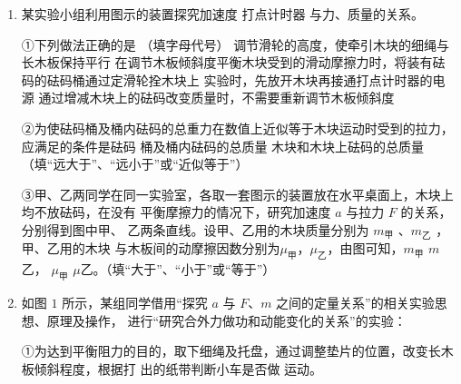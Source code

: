 \begin{enumerate}
\renewcommand{\labelenumi}{\arabic{enumi}.}
\item
{}
某实验小组利用图示的装置探究加速度
打点计时器
与力、质量的关系。
\begin{figure}[h!]
\centering

\end{figure}



①下列做法正确的是  （填字母代号）
\fourchoices
{调节滑轮的高度，使牵引木块的细绳与长木板保持平行}
{在调节木板倾斜度平衡木块受到的滑动摩擦力时，将装有砝码的砝码桶通过定滑轮拴木块上}
{实验时，先放开木块再接通打点计时器的电源}
{通过增减木块上的砝码改变质量时，不需要重新调节木板倾斜度}

②为使砝码桶及桶内砝码的总重力在数值上近似等于木块运动时受到的拉力，应满足的条件是砝码
桶及桶内砝码的总质量
木块和木块上砝码的总质量（填“远大于”、“远小于”或“近似等于”）


③甲、乙两同学在同一实验室，各取一套图示的装置放在水平桌面上，木块上均不放砝码，在没有
平衡摩擦力的情况下，研究加速度 $ a $ 与拉力 $ F $ 的关系，分别得到图中甲、
乙两条直线。设甲、乙用的木块质量分别为 $ m_{ \text{甲} } $ 、$ m_{ \text{乙} } $ ，甲、乙用的木块
与木板间的动摩擦因数分别为$ \mu_{ \text{甲} } $，$ \mu_{ \text{乙} } $，由图可知，$ m_{ \text{甲} } $ 
$ m $ 乙，
$ \mu_{ \text{甲} } $
$ \mu $乙。（填“大于”、“小于”或“等于”）
\begin{figure}[h!]
\centering

\end{figure}



\newpage
\item 
{}
如图 $ 1 $ 所示，某组同学借用“探究 $ a $ 与 $ F $、$ m $ 之间的定量关系”的相关实验思想、原理及操作，
进行“研究合外力做功和动能变化的关系”的实验：
\begin{figure}[h!]
\centering

\end{figure}




①为达到平衡阻力的目的，取下细绳及托盘，通过调整垫片的位置，改变长木板倾斜程度，根据打
出的纸带判断小车是否做  运动。



\end{enumerate}
